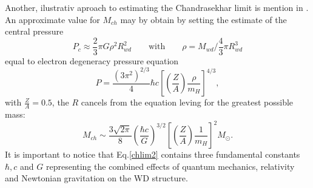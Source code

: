 \documentclass[oneside,a4paper,11pt]{report}
\begin{document}
                                                                                                                                                                                                                                                                                                                                                                                                                                                                                                                                                                                                                                                                                                                                                                                                                                                                                                                                                                                                                                                                                                                                                                                                                                                                                                                                                                                                                                                                                                                                                                                                                                                                                                                                                                                                                      
Another, ilustrativ aproach to estimating the Chandrasekhar limit is mention in \citet{2007ima..book.....C}. An approximate value for $M_{ch}$ may by 
obtain by setting the estimate of the central pressure
\begin{equation}
 P_c \approx \frac{2}{3} \pi G \rho^2 R_{wd}^2 \qquad \text{with} \qquad \rho=M_{wd} / \frac{4}{3} \pi R_{wd}^3  
\end{equation}
equal to electron degeneracy pressure equation
\begin{equation}
 \label{edegP}
P = \frac{(3\pi^2)^{2/3}}{4} \hbar c \left[ \left( \frac{Z}{A}\right) \frac{\rho}{m_H}\right]^{4/3},
\end{equation}
with $\frac{Z}{A}=0.5$, the $R$ cancels from the equation leving for the greatest possible mass:
\begin{equation}
 \label{chlim2}
M_{ch} \sim \frac{3\sqrt{2\pi}}{8}\left ( \frac{\hbar c}{G} \right )^{3/2}\left [ \left ( \frac{Z}{A} \right ) \frac{1}{m_H} \right ]^2 M_\odot.  
\end{equation}
It is important to notice that Eq.\eqref{chlim2} contains three fundamental constants $\hbar, c$ and $G$ representing the combined effects of quantum mechanics, 
relativity and Newtonian gravitation on the WD structure. 
\end{document}
